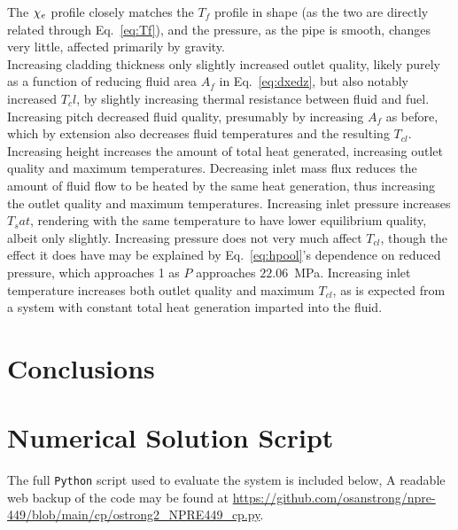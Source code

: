 \documentclass[12pt]{article}
\newcommand{\Python}{\texttt{Python}\xspace}
\begin{document}
The $\chi_e$ profile closely matches the $T_f$ profile in shape (as the two are directly related through Eq.~\ref{eq:Tf}), and the pressure, as the pipe is smooth, changes very little, affected primarily by gravity.\\

Increasing cladding thickness only slightly increased outlet quality, likely purely as a function of reducing fluid area $A_f$ in Eq.~\ref{eq:dxedz}, but also notably increased $T_cl$, by slightly increasing thermal resistance between fluid and fuel.
Increasing pitch decreased fluid quality, presumably by increasing $A_f$ as before, which by extension also decreases fluid temperatures and the resulting $T_{cl}$.
Increasing height increases the amount of total heat generated, increasing outlet quality and maximum temperatures.
Decreasing inlet mass flux reduces the amount of fluid flow to be heated by the same heat generation, thus increasing the outlet quality and maximum temperatures.
Increasing inlet pressure increases $T_sat$, rendering with the same temperature to have lower equilibrium quality, albeit only slightly.
Increasing pressure does not very much affect $T_{cl}$, though the effect it does have may be explained by Eq.~\ref{eq:hpool}'s dependence on reduced pressure, which approaches 1 as $P$ approaches $22.06$~MPa.
Increasing inlet temperature increases both outlet quality and maximum $T_{cl}$, as is expected from a system with constant total heat generation imparted into the fluid.
\section{Conclusions}\label{sec:conc}
\pagebreak
\printbibliography
\pagebreak
\appendix
\section{Numerical Solution Script}\label{app:efd-script}
The full \Python script used to evaluate the system is included below,
A readable web backup of the code may be found at \url{https://github.com/osanstrong/npre-449/blob/main/cp/ostrong2_NPRE449_cp.py}.

\end{document}
